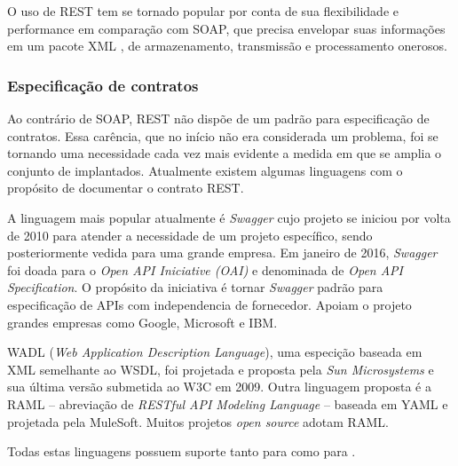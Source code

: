 O uso de REST tem se tornado popular por conta de sua flexibilidade e
performance em comparação com SOAP, que precisa envelopar suas informações em
um pacote XML \cite{mumbaikar2013web}, de armazenamento, transmissão e
processamento onerosos.

\subsubsection{Especificação de contratos}
\vspace{-6mm}

Ao contrário de SOAP, REST não dispõe de um padrão para especificação de
contratos. Essa carência, que no início não era considerada um problema, foi se
tornando uma necessidade cada vez mais evidente a medida em que se amplia o
conjunto de \wss{} implantados. Atualmente existem algumas linguagens com o
propósito de documentar o contrato REST.

A linguagem mais popular atualmente é \textit{Swagger} cujo projeto se iniciou
por volta de 2010 para atender a necessidade de um projeto específico, sendo posteriormente
vedida para uma grande empresa. Em janeiro de 2016, \textit{Swagger} foi doada
para o \textit{Open API Iniciative (OAI)} e denominada de \textit{Open API
Specification}. O propósito da iniciativa é tornar \textit{Swagger} padrão para
especificação de APIs com independencia de fornecedor. Apoiam o projeto grandes
empresas como Google\textsuperscript{\textregistered},
Microsoft\textsuperscript{\textregistered} e
IBM\textsuperscript{\textregistered}.

WADL (\textit{Web Application Description Language}), uma especição baseada em
XML semelhante ao WSDL, foi projetada e proposta pela \textit{Sun
Microsystems}\textsuperscript{\textregistered} e sua última versão submetida
ao W3C em 2009. Outra linguagem proposta é a RAML -- abreviação de
\textit{RESTful API Modeling Language} -- baseada em YAML e projetada pela
MuleSoft\textsuperscript{\textregistered}. Muitos projetos \textit{open source} adotam RAML.

Todas estas linguagens possuem suporte tanto para \CdFirst{} como para
\CtFirst{} \cite{wideberg2015restful}.




